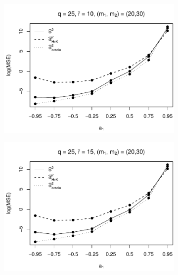 \begin{figure}[p]
\begin{subfigure}[b]{0.45\textwidth}
\includegraphics[width=\textwidth]{Plots/Robustness/MSE_lrv_T=500_slope=10_(q,r,M1,M2)=(25,10,20,30).pdf}
\end{subfigure}
\hspace{0.25cm}
\begin{subfigure}[b]{0.45\textwidth}
\includegraphics[width=\textwidth]{Plots/Robustness/MSE_lrv_T=500_slope=10_(q,r,M1,M2)=(25,15,20,30).pdf}
\end{subfigure}


\end{figure}

